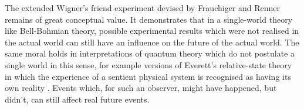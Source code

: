 \documentclass[12pt,a4paper,reqno]{article}
\newcommand{\ok}{\text{ok}}
\renewcommand{\(}{\left(}
\renewcommand{\)}{\right)}
\renewcommand{\.}{\centerdot}
\newcommand{\1}{\mathbf{1}}
\newcommand{\<}{\langle}
\renewcommand{\>}{\rangle}
\newcommand{\FR}{Frauchiger and Renner}
\theoremstyle{definition}
\theoremstyle{remark}
\numberwithin{equation}{section}
\begin{document}



%

The extended Wigner's friend experiment devised by Frauchiger and Renner remains of great conceptual value. It demonstrates that in a single-world theory like Bell-Bohmian theory, possible experimental results which were not realised in the actual world can still have an influence on the future of the actual world. The same moral holds in interpretations of quantum theory which do not postulate a single world in this sense, for example versions of Everett's relative-state theory in which the experience of a sentient physical system is recognised as having its own reality \cite{verdammte}. Events which, for such an observer, might have happened, but didn't, can still affect real future events.
\end{document}
